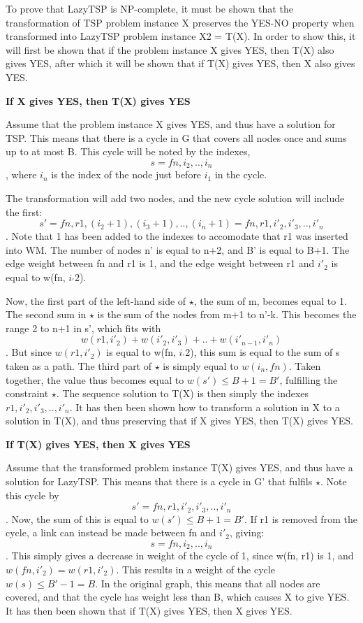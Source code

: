 To prove that LazyTSP is NP-complete, it must be shown that the
transformation of TSP problem instance X preserves the YES-NO property
when transformed into LazyTSP problem instance X2 = T(X).
In order to show this, it will first be shown that
if the problem instance X gives YES, then T(X) also gives YES,
after which it will be shown that if T(X) gives YES, then X also gives YES.

\textbf{If X gives YES, then T(X) gives YES}

Assume that the problem instance X gives YES, and thus have a solution
for TSP. This means that there is a cycle in G that covers all nodes
once and sums up to at most B. This cycle will be noted by the indexes,
\[s = fn, i_2, .., i_n\], where \(i_n\) is the index of the node just before \(i_1\)
in the cycle.

The transformation will add two nodes, and the new cycle solution will include
the first:
\[s' = fn, r1, (i_2+1), (i_3+1), .., (i_n+1) = fn, r1, i'_2, i'_3, .., i'_n\].
Note that 1 has been added to the indexes to accomodate that r1 was inserted into WM.
The number of nodes n' is equal to n+2, and B' is equal to B+1.
The edge weight between fn and r1 is 1, and the edge weight between r1 and
\(i'_2\) is equal to w(fn, \(i_'2\)).

Now, the first part of the left-hand side of \(\star\), the sum of m, becomes equal to 1.
The second sum in \(\star\) is the sum of the nodes from
m+1 to n'-k. This becomes the range 2 to n+1 in s', which fits with
\[w(r1, i'_2) + w(i'_2, i'_3) + .. + w(i'_{n-1}, i'_n)\].
But since \(w(r1, i'_2)\) is equal to w(fn, \(i_'2\)), this
sum is equal to the sum of s taken as a path.
The third part of \(\star\) is simply equal to \(w(i_n, fn)\).
Taken together, the value thus becomes equal to \(w(s') \leq B + 1 = B'\),
fulfilling the constraint \(\star\). The sequence solution to T(X) is then simply the indexes
\(r1, i'_2, i'_3, .., i'_n\).
It has then been shown how to transform a solution in X to a solution in
T(X), and thus preserving that if X gives YES, then T(X) gives YES.

\textbf{If T(X) gives YES, then X gives YES}

Assume that the transformed problem instance T(X) gives YES, and thus
have a solution for LazyTSP. This means that there is a cycle in G'
that fulfils \(\star\). Note this cycle by
\[s' = fn, r1, i'_2, i'_3, .., i'_n\].
Now, the sum of this is equal to \(w(s') \leq B + 1 = B'\). If r1 is removed from the cycle,
a link can instead be made between fn and \(i'_2\), giving: 
\[s = fn, i_2, .., i_n\].
This simply gives a decrease in weight of the cycle of 1, since w(fn, r1) is 1, and
\(w(fn, i'_2) = w(r1, i'_2)\). This results in a weight of the cycle
\(w(s) \leq B'-1 = B\). In the original graph, this means that all nodes are covered,
and that the cycle has weight less than B, which causes X to give YES.
It has then been shown that if T(X) gives YES, then X gives YES.

